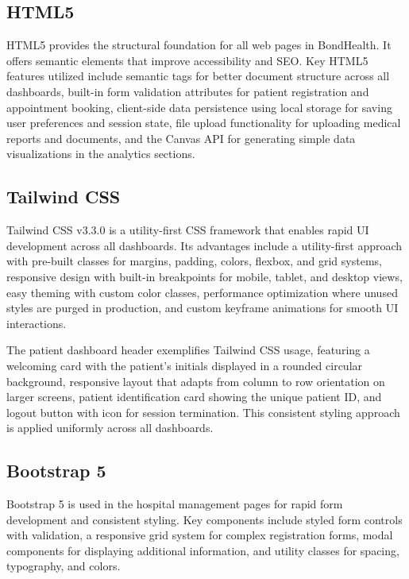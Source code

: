 \subsection{HTML5}

\justifying
\noindent HTML5 provides the structural foundation for all web pages in BondHealth. It offers semantic elements that improve accessibility and SEO. Key HTML5 features utilized include semantic tags for better document structure across all dashboards, built-in form validation attributes for patient registration and appointment booking, client-side data persistence using local storage for saving user preferences and session state, file upload functionality for uploading medical reports and documents, and the Canvas API for generating simple data visualizations in the analytics sections.

\subsection{Tailwind CSS}

\justifying
\noindent Tailwind CSS v3.3.0 is a utility-first CSS framework that enables rapid UI development across all dashboards. Its advantages include a utility-first approach with pre-built classes for margins, padding, colors, flexbox, and grid systems, responsive design with built-in breakpoints for mobile, tablet, and desktop views, easy theming with custom color classes, performance optimization where unused styles are purged in production, and custom keyframe animations for smooth UI interactions.

\noindent The patient dashboard header exemplifies Tailwind CSS usage, featuring a welcoming card with the patient's initials displayed in a rounded circular background, responsive layout that adapts from column to row orientation on larger screens, patient identification card showing the unique patient ID, and logout button with icon for session termination. This consistent styling approach is applied uniformly across all dashboards.

\subsection{Bootstrap 5}

\justifying
\noindent Bootstrap 5 is used in the hospital management pages for rapid form development and consistent styling. Key components include styled form controls with validation, a responsive grid system for complex registration forms, modal components for displaying additional information, and utility classes for spacing, typography, and colors.

